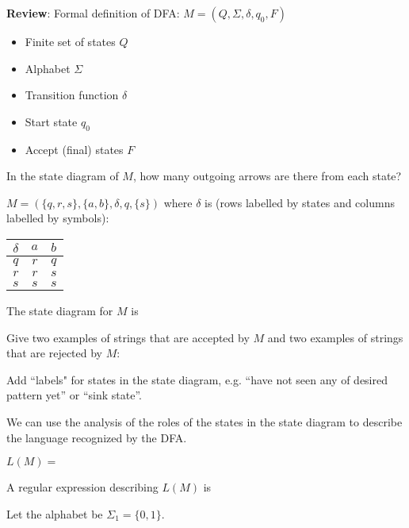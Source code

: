 \documentclass[12pt, oneside]{article}
\begin{document}
{\bf Review}: Formal definition of DFA: $M = (Q, \Sigma, \delta, q_0, F)$ 

\begin{center}
\begin{multicols}{2}
\begin{itemize}
\setlength{\itemsep}{2pt}
\item Finite set of states $Q$
\item Alphabet $\Sigma$
\item Transition function $\delta$
\item Start state $q_0$
\item Accept (final) states $F$
\end{itemize}
\end{multicols}
\end{center}
In the state diagram of $M$, how many outgoing arrows are there from each state?

$M = ( \{ q, r, s\}, \{a,b\}, \delta, q, \{s\} )$ 
where $\delta$ is  (rows labelled by states
and columns labelled by symbols):
\begin{center}
\begin{tabular}{c|cc}
$\delta$ & $a$ & $b$ \\
\hline
$q$ & $r$ & $q$ \\
$r$ & $r$ & $s$ \\
$s$ & $s$ & $s$ \\
\end{tabular}
\end{center}

The state diagram for $M$ is 

\vfill



Give two examples of strings that are accepted by $M$ and two examples of strings that are rejected by $M$:

\vfill

Add ``labels" for states in the state diagram, e.g. ``have not seen any of desired pattern yet'' or
``sink state''.
\newpage

We can use the analysis of the roles of the states in the state diagram to describe the language
recognized by the DFA. 


$L(M) = $

A regular expression describing $L(M)$ is




\vspace{300pt}

Let the alphabet be $\Sigma_1 = \{0,1\}$.
\end{document}
